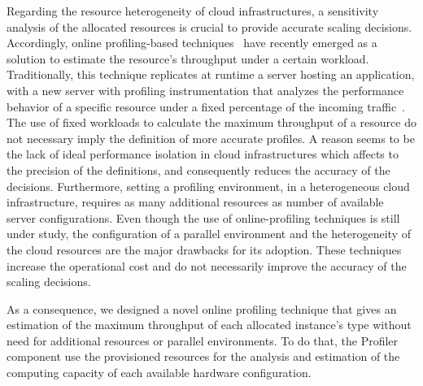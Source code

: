 Regarding the resource heterogeneity of cloud infrastructures, a sensitivity analysis of the allocated resources is crucial to provide accurate scaling decisions. Accordingly, online profiling-based techniques~\cite{kaviani_profiling-as--service:_2011} have recently emerged as a solution to  estimate the resource's throughput under a certain workload. Traditionally, this technique replicates at runtime a server hosting an application, with a new server with profiling instrumentation that analyzes the performance behavior of a specific resource under a fixed percentage of the incoming traffic~\cite{jiangThesis,dejavu2012}. The use of fixed workloads to calculate the maximum throughput of a resource do not necessary imply the definition of more accurate profiles. A reason seems to be the lack of ideal performance isolation in cloud infrastructures which affects to the precision of the definitions, and consequently reduces the accuracy of the decisions. Furthermore, setting a profiling environment, in a heterogeneous cloud infrastructure, requires as many additional resources as number of available server configurations. Even though the use of online-profiling techniques is still under study, the configuration of a parallel environment and the heterogeneity of the cloud resources are the major drawbacks for its adoption. These techniques increase the operational cost and do not necessarily improve the accuracy of the scaling decisions.


As a consequence, we designed a novel online profiling technique that gives an estimation of the maximum throughput of each allocated instance's type without need for additional resources or parallel environments. To do that, the Profiler component use the provisioned resources for the analysis and estimation of the computing capacity of each available hardware configuration.

